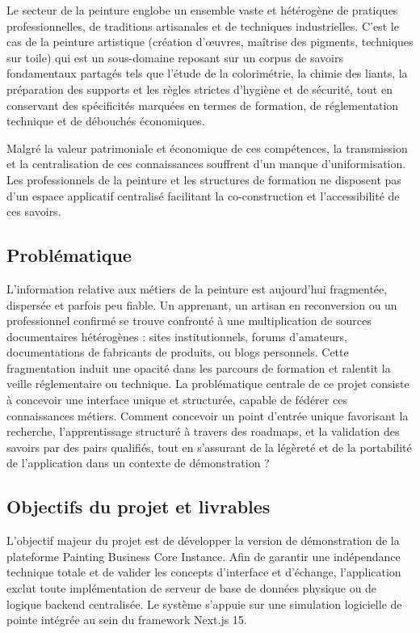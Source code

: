\documentclass[12pt,a4paper]{report}
\begin{document}
Le secteur de la peinture englobe un ensemble vaste et hétérogène de pratiques professionnelles, de traditions artisanales et de techniques industrielles. C'est le cas de la peinture artistique (création d'œuvres, maîtrise des pigments, techniques sur toile) qui est un sous-domaine reposant sur un corpus de savoirs fondamentaux partagés tels que l'étude de la colorimétrie, la chimie des liants, la préparation des supports et les règles strictes d'hygiène et de sécurité, tout en conservant des spécificités marquées en termes de formation, de réglementation technique et de débouchés économiques.

Malgré la valeur patrimoniale et économique de ces compétences, la transmission et la centralisation de ces connaissances souffrent d'un manque d'uniformisation. Les professionnels de la peinture et les structures de formation ne disposent pas d'un espace applicatif centralisé facilitant la co-construction et l'accessibilité de ces savoirs.

\subsection*{Problématique}

L'information relative aux métiers de la peinture est aujourd'hui fragmentée, dispersée et parfois peu fiable. Un apprenant, un artisan en reconversion ou un professionnel confirmé se trouve confronté à une multiplication de sources documentaires hétérogènes : sites institutionnels, forums d'amateurs, documentations de fabricants de produits, ou blogs personnels. Cette fragmentation induit une opacité dans les parcours de formation et ralentit la veille réglementaire ou technique. La problématique centrale de ce projet consiste à concevoir une interface unique et structurée, capable de fédérer ces connaissances métiers. Comment concevoir un point d'entrée unique favorisant la recherche, l'apprentissage structuré à travers des roadmaps, et la validation des savoirs par des pairs qualifiés, tout en s'assurant de la légèreté et de la portabilité de l'application dans un contexte de démonstration ?

\subsection*{Objectifs du projet et livrables}

L'objectif majeur du projet est de développer la version de démonstration de la plateforme Painting Business Core Instance. Afin de garantir une indépendance technique totale et de valider les concepts d'interface et d'échange, l'application exclut toute implémentation de serveur de base de données physique ou de logique backend centralisée. Le système s'appuie sur une simulation logicielle de pointe intégrée au sein du framework Next.js 15.
\end{document}
